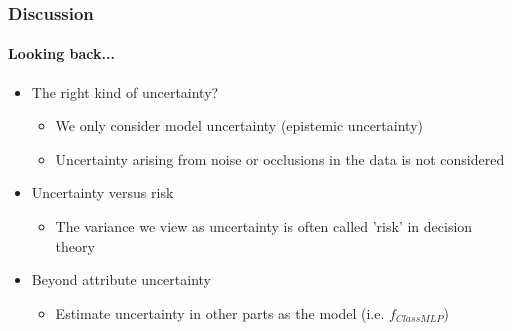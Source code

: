 \documentclass[9pt]{beamer}
\begin{document}
\begin{frame}
\frametitle{Discussion}
\framesubtitle{Looking back...}
\begin{itemize}
	\item The right kind of uncertainty?
	\begin{itemize}
		\item We only consider model uncertainty (epistemic uncertainty)
		\item Uncertainty arising from noise or occlusions in the data is not considered
	\end{itemize}
	\item Uncertainty versus risk
	\begin{itemize}
		\item The variance we view as uncertainty is often called 'risk' in decision theory
	\end{itemize}
	\item Beyond attribute uncertainty
	\begin{itemize}
		\item Estimate uncertainty in other parts as the model (i.e. $f_{ClassMLP}$)
	\end{itemize}
\end{itemize}

\end{frame} 
\end{document}
